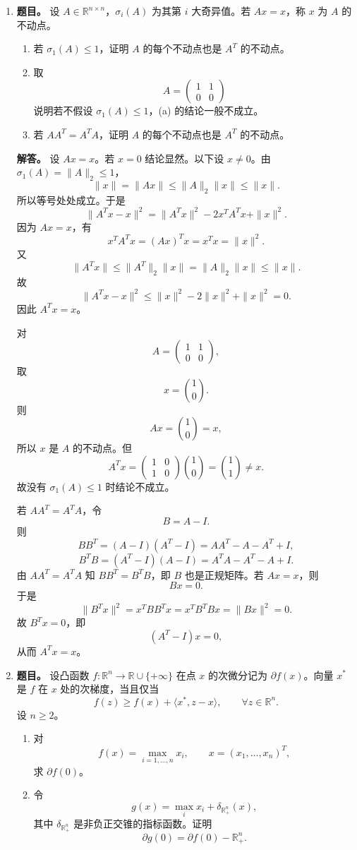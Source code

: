 ﻿\documentclass[UTF8,12pt]{ctexart}
\begin{document}
\begin{enumerate}[label=\textbf{\arabic*.},leftmargin=2.2em]
\item \textbf{题目。} 设 \(A\in\mathbb R^{n\times n}\)，\(\sigma_i(A)\) 为其第 \(i\) 大奇异值。若 \(Ax=x\)，称 \(x\) 为 \(A\) 的不动点。
\begin{enumerate}[label=(\alph*),leftmargin=2.0em]
\item 若 \(\sigma_1(A)\le1\)，证明 \(A\) 的每个不动点也是 \(A^T\) 的不动点。
\item 取
\[
A=\begin{pmatrix}1&1\\0&0\end{pmatrix}
\]
说明若不假设 \(\sigma_1(A)\le1\)，(a) 的结论一般不成立。
\item 若 \(AA^T=A^TA\)，证明 \(A\) 的每个不动点也是 \(A^T\) 的不动点。
\end{enumerate}

\textbf{解答。} 设 \(Ax=x\)。若 \(x=0\) 结论显然。以下设 \(x\ne0\)。由 \(\sigma_1(A)=\|A\|_2\le1\)，
\[
\|x\|=\|Ax\|\le \|A\|_2\|x\|\le\|x\|.
\]
所以等号处处成立。于是
\[
\|A^Tx-x\|^2
=\|A^Tx\|^2-2x^TA^Tx+\|x\|^2.
\]
因为 \(Ax=x\)，有
\[
x^TA^Tx=(Ax)^Tx=x^Tx=\|x\|^2.
\]
又
\[
\|A^Tx\|\le \|A^T\|_2\|x\|=\|A\|_2\|x\|\le\|x\|.
\]
故
\[
\|A^Tx-x\|^2\le \|x\|^2-2\|x\|^2+\|x\|^2=0.
\]
因此 \(A^Tx=x\)。

对
\[
A=\begin{pmatrix}1&1\\0&0\end{pmatrix},
\]
取
\[
x=\binom10.
\]
则
\[
Ax=\binom10=x,
\]
所以 \(x\) 是 \(A\) 的不动点。但
\[
A^Tx=
\begin{pmatrix}1&0\\1&0\end{pmatrix}
\binom10
=\binom11\ne x.
\]
故没有 \(\sigma_1(A)\le1\) 时结论不成立。

若 \(AA^T=A^TA\)，令
\[
B=A-I.
\]
则
\[
BB^T=(A-I)(A^T-I)=AA^T-A-A^T+I,
\]
\[
B^TB=(A^T-I)(A-I)=A^TA-A^T-A+I.
\]
由 \(AA^T=A^TA\) 知 \(BB^T=B^TB\)，即 \(B\) 也是正规矩阵。若 \(Ax=x\)，则
\[
Bx=0.
\]
于是
\[
\|B^Tx\|^2=x^TBB^Tx=x^TB^TBx=\|Bx\|^2=0.
\]
故 \(B^Tx=0\)，即
\[
(A^T-I)x=0,
\]
从而 \(A^Tx=x\)。

\item \textbf{题目。} 设凸函数 \(f:\mathbb R^n\to\mathbb R\cup\{+\infty\}\) 在点 \(x\) 的次微分记为 \(\partial f(x)\)。向量 \(x^*\) 是 \(f\) 在 \(x\) 处的次梯度，当且仅当
\[
f(z)\ge f(x)+\langle x^*,z-x\rangle,\qquad \forall z\in\mathbb R^n.
\]
设 \(n\ge2\)。
\begin{enumerate}[label=(\alph*),leftmargin=2.0em]
\item 对
\[
f(x)=\max_{i=1,\ldots,n}x_i,\qquad x=(x_1,\ldots,x_n)^T,
\]
求 \(\partial f(0)\)。
\item 令
\[
g(x)=\max_i x_i+\delta_{\mathbb R_+^n}(x),
\]
其中 \(\delta_{\mathbb R_+^n}\) 是非负正交锥的指标函数。证明
\[
\partial g(0)=\partial f(0)-\mathbb R_+^n.
\]
\end{enumerate}


\end{enumerate}
\end{document}
